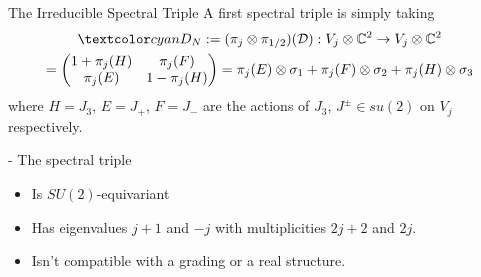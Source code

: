 \begin{frame}{The Irreducible Spectral Triple} %
A first spectral triple is simply taking 
\begin{multline}
    \lbtext{D_N} := (\pi_j \otimes \pi_{1/2})(\mathcal D): V_j \otimes \CC^2 \to V_j \otimes \CC^2 \\= \begin{pmatrix} 1 + \pi_j(H) & \pi_j(F) \\ \pi_j(E) & 1 - \pi_j(H)\end{pmatrix} = \pi_j(E) \otimes \sigma_1 + \pi_j(F) \otimes \sigma_2 + \pi_j(H) \otimes \sigma_3
\end{multline} where $H = J_3$, $E = J_+$, $F = J_-$ are the actions of $J_3$, $J^\pm \in su(2)$ on $V_j$ respectively.

- The spectral triple 
    \begin{itemize}
        
    \item Is $SU(2)$-equivariant
    
    \item Has eigenvalues $j+1$ and $-j$ with multiplicities $2j+2$ and $2j$.
        
    \item Isn't compatible with a grading or a real structure.
    \end{itemize}

\end{frame}

